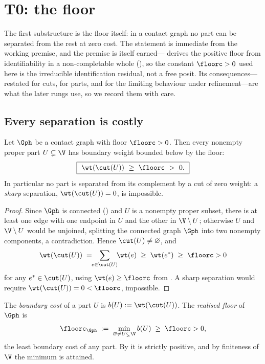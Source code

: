 
\section{T0: the floor}
\label{sec:floor}

The first substructure is the floor itself: in a contact graph no part can be
separated from the rest at zero cost. The statement is immediate from the
working premise, and the premise is itself earned--- derives the
positive floor from identifiability in a non-completable whole
(), so the constant $\floorc>0$ used
here is the irreducible identification residual, not a free posit. Its
consequences---restated for cuts, for parts, and for the limiting behaviour under
refinement---are what the later rungs use, so we record them with care.

\subsection{Every separation is costly}

\begin{theorem}
\label{thm:floor}
Let $\Gph$ be a contact graph with floor $\floorc>0$. Then every nonempty proper
part $U\subsetneq\V$ has boundary weight bounded below by the floor:
\[
\boxed{\ \wt(\cut(U))\ \ge\ \floorc\ >\ 0.\ }
\]
In particular no part is separated from its complement by a cut of zero
weight: a \emph{sharp} separation, $\wt(\cut(U))=0$, is impossible.
\end{theorem}

\begin{proof}
Since $\Gph$ is connected () and $U$ is a nonempty proper
subset, there is at least one edge with one endpoint in $U$ and the other in
$\V\setminus U$; otherwise $U$ and $\V\setminus U$ would be unjoined, splitting
the connected graph $\Gph$ into two nonempty components, a contradiction. Hence
$\cut(U)\neq\varnothing$, and
\[
\wt(\cut(U))\;=\!\!\sum_{e\in\cut(U)}\!\!\wt(e)\;\ge\;\wt(e^\ast)\;\ge\;\floorc>0
\]
for any $e^\ast\in\cut(U)$, using $\wt(e)\ge\floorc$ from . A
sharp separation would require $\wt(\cut(U))=0<\floorc$, impossible.
\end{proof}

\begin{definition}
\label{def:boundarycost}
The \emph{boundary cost} of a part $U$ is $b(U):=\wt(\cut(U))$. The
\emph{realised floor} of $\Gph$ is
\[
\floorc_\Gph\;:=\;\min_{\varnothing\neq U\subsetneq\V} b(U)\;\ge\;\floorc>0,
\]
the least boundary cost of any part. By  it is strictly
positive, and by finiteness of $\V$ the minimum is attained.
\end{definition}

